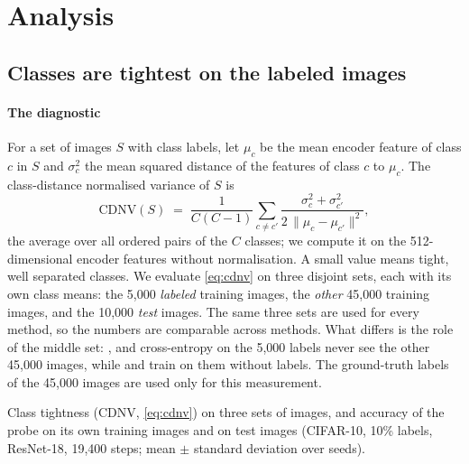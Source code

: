 \section{Analysis}
\label{sec:analysis}

\subsection{Classes are tightest on the labeled images}
\label{sec:geometry}

\paragraph{The diagnostic}
For a set of images $S$ with class labels, let $\mu_c$ be the mean encoder feature of class $c$ in $S$ and
$\sigma_c^2$ the mean squared distance of the features of class $c$ to $\mu_c$. The class-distance
normalised variance \citep{galanti2022role} of $S$ is
\begin{equation}
\label{eq:cdnv}
\mathrm{CDNV}(S) \;=\; \frac{1}{C(C-1)}\sum_{c\neq c'} \frac{\sigma_c^2+\sigma_{c'}^2}{2\,\lVert\mu_c-\mu_{c'}\rVert^2},
\end{equation}
the average over all ordered pairs of the $C$ classes; we compute it on the 512-dimensional encoder
features without normalisation. A small value means tight, well separated classes. We evaluate
\cref{eq:cdnv} on three disjoint sets, each with its own class means: the 5,000 \emph{labeled} training
images, the \emph{other} 45,000 training images, and the 10,000 \emph{test} images. The same three sets are
used for every method, so the numbers are comparable across methods. What differs is the role of the middle
set: \supcon, \simclrsub and cross-entropy on the 5,000 labels never see the other 45,000 images, while
\simclr and \union train on them without labels. The ground-truth labels of the 45,000 images are used only
for this measurement.

\begin{table}[t]
\centering
\small
\caption{Class tightness (CDNV, \cref{eq:cdnv}) on three sets of images, and accuracy of the \lpfive probe on
its own training images and on test images (CIFAR-10, 10\% labels, ResNet-18, 19,400 steps; mean $\pm$
standard deviation over seeds).}
\label{tab:geometry}
\begin{adjustbox}{max width=\linewidth}

\end{adjustbox}
\end{table}

